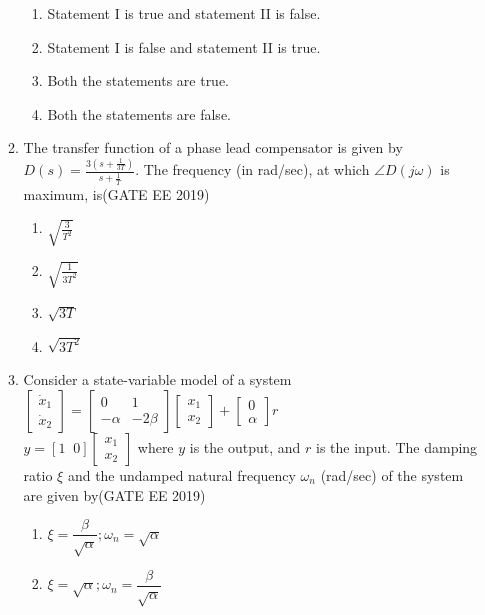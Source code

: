 \documentclass[a4paper,10pt]{exam}
\theoremstyle{remark}
\begin{document}
\begin{enumerate}
\begin{enumerate}[label=\arabic*.]
\begin{enumerate}
\item Statement I is true and statement II is false.
\item Statement I is false and statement II is true.
\item Both the statements are true.
\item Both the statements are false.
\end{enumerate}
\item The transfer function of a phase lead compensator is given by
$
D(s) = \frac{3 \left( s + \frac{1}{3T} \right)}{s + \frac{1}{T}}.
$
The frequency (in rad/sec), at which $ \angle D(j\omega)$  is maximum, is\hfill{(GATE EE 2019)}
\begin{multicols}{4}
\begin{enumerate}
    \item $\sqrt{\frac{3}{T^2}}$
    \item $\sqrt{\frac{1}{3T^2}}$
    \item $\sqrt{3T}$
    \item $\sqrt{3T^2}$
\end{enumerate}
\end{multicols}
\item Consider a state-variable model of a system
$
 \begin{bmatrix}
\dot{x}_1 \\
\dot{x}_2
\end{bmatrix}
=
 \begin{bmatrix}
0 & 1 \\
-\alpha & -2\beta
\end{bmatrix}
 \begin{bmatrix}
x_1 \\
x_2
\end{bmatrix}
+
 \begin{bmatrix}
0 \\
\alpha
\end{bmatrix}
r
$\\
$y = [1 \;\; 0]
 \begin{bmatrix}
x_1 \\
x_2
\end{bmatrix}$
where $y$ is the output, and $r$ is the input. The damping ratio $\xi$ and the undamped natural frequency $\omega_n$ (rad/sec) of the system are given by\hfill{(GATE EE 2019)}
\begin{enumerate}
\item $\xi = \dfrac{\beta}{\sqrt{\alpha}}; \omega_n = \sqrt{\alpha}$
\item $\xi = \sqrt{\alpha}; \omega_n = \dfrac{\beta}{\sqrt{\alpha}}$

\end{enumerate}
\end{enumerate}
\end{enumerate}
\end{document}
